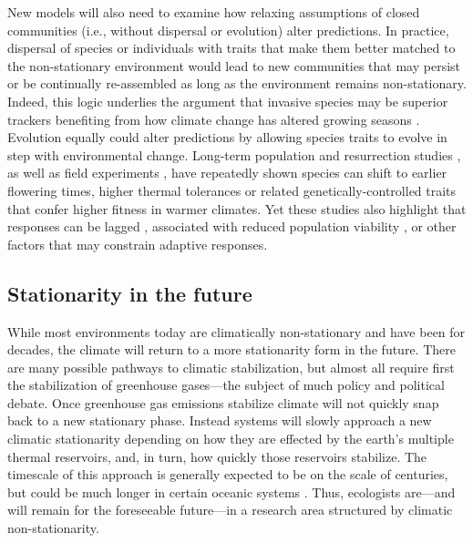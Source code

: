 \documentclass[11pt,letterpaper]{article}
\begin{document}
New models will also need to examine how relaxing assumptions of closed communities (i.e., without dispersal or evolution) alter predictions. In practice, dispersal of species or individuals with traits that make them better matched to the non-stationary environment would lead to new communities that may persist or be continually re-assembled as long as the environment remains non-stationary. Indeed, this logic underlies the argument that invasive species may be superior trackers benefiting from how climate change has altered growing seasons \citep{Willis:2010al,wolkovich:2010fee}. Evolution equally could alter predictions by allowing species traits to evolve in step with environmental change. Long-term population \citep[e.g.,][]{colautti2017} and resurrection studies \citep{wilczek2014,yousey2018}, as well as field experiments \citep{colautti2017,arab2019}, have repeatedly shown species can shift to earlier flowering times, higher thermal tolerances or related genetically-controlled traits that confer higher fitness in warmer climates. Yet these studies also highlight that responses can be lagged \citep[e.g.,][]{wilczek2014}, associated with reduced population viability \citep[e.g.,][]{colautti2017}, or other factors that may constrain adaptive responses. 

\subsection{Stationarity in the future}
While most environments today are climatically non-stationary and have been for decades, the climate will return to a more stationarity form in the future. There are many possible pathways to climatic stabilization, but almost all require first the stabilization of greenhouse gases---the subject of much policy and political debate. Once greenhouse gas emissions stabilize climate will not quickly snap back to a new stationary phase. Instead systems will slowly approach a new climatic stationarity depending on how they are effected by the earth's multiple thermal reservoirs, and, in turn, how quickly those reservoirs stabilize. The timescale of this approach is generally expected to be on the scale of centuries, but could be much longer in certain oceanic systems \citep{ipcc2013ch12}. Thus, ecologists are---and will remain for the foreseeable future---in a research area structured by climatic non-stationarity. 
\end{document}
